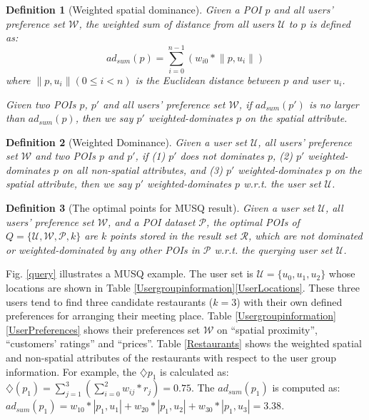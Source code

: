 \documentclass[10pt, conference, compsocconf]{IEEEtran}
\newtheorem{myDef}{Definition}
\begin{document}
\begin{myDef}[Weighted spatial dominance]\label{Definition4}
    Given a POI $p$ and all users' preference set $\mathcal{W}$, the weighted sum of distance from all users $\mathcal{U}$ to $p$ is defined as:
    \begin{equation*}
        ad_{sum}(p) = \sum_{i=0}^{n-1}(w_{i0} * \lVert p,u_i\rVert)
    \end{equation*}
    where $\lVert p,u_i\rVert (0 \leq i < n)$ is the Euclidean distance between $p$ and user $u_i$.

    Given two POIs $p$, $p'$ and  all users' preference set $\mathcal{W}$, if $ad_{sum}(p')$ is no larger than $ad_{sum}(p)$, then we say $p'$ weighted-dominates $p$ on the spatial attribute.
\end{myDef}

\begin{myDef}[Weighted Dominance]\label{Definition5}
    Given a user set $\mathcal{U}$, all users' preference set $\mathcal{W}$ and two POIs $p$ and $p'$, if (1) $p'$ does not dominates $p$, (2) $p'$ weighted-dominates $p$ on all non-spatial attributes, and (3) $p'$ weighted-dominates $p$ on the spatial attribute, then we say $p'$ weighted-dominates $p$ w.r.t. the user set $\mathcal{U}$.
\end{myDef}

\begin{myDef}[The optimal points for MUSQ result]\label{Definition6}
    Given a user set $\mathcal{U}$, all users' preference set $\mathcal{W}$, and a POI dataset $\mathcal{P}$, the optimal POIs of $Q = \{\mathcal{U},\mathcal{W},\mathcal{P},k\}$ are $k$ points stored in the result set $\mathcal{R}$, which are not dominated or weighted-dominated by any other POIs in $\mathcal{P}$ w.r.t. the querying user set $\mathcal{U}$.
\end{myDef}

Fig. \ref{query} illustrates a MUSQ example. The user set is $\mathcal{U}=\{u_0, u_1, u_2\}$ whose locations are shown in Table \ref{Usergroupinformation}\ref{UserLocations}. These three users tend to find three candidate restaurants ($k=3$) with their own defined preferences for arranging their meeting place. Table \ref{Usergroupinformation}\ref{UserPreferences} shows their preferences set $\mathcal{W}$ on ``spatial proximity'', ``customers' ratings'' and ``prices''. Table \ref{Restaurants} shows the weighted spatial and non-spatial attributes of the restaurants with respect to the user group information. For example, the $\diamondsuit{p_1}$ is calculated as: $\diamondsuit(p_1) =  \sum_{j=1}^{3}(\sum_{i=0}^{2}w_{ij} * r_j) = 0.75$. The $ad_{sum}(p_1)$ is computed as: $ad_{sum}(p_1) = w_{10}*|p_1,u_1| + w_{20}*|p_1,u_2| +  w_{30}*|p_1,u_3| = 3.38$.
\end{document}
